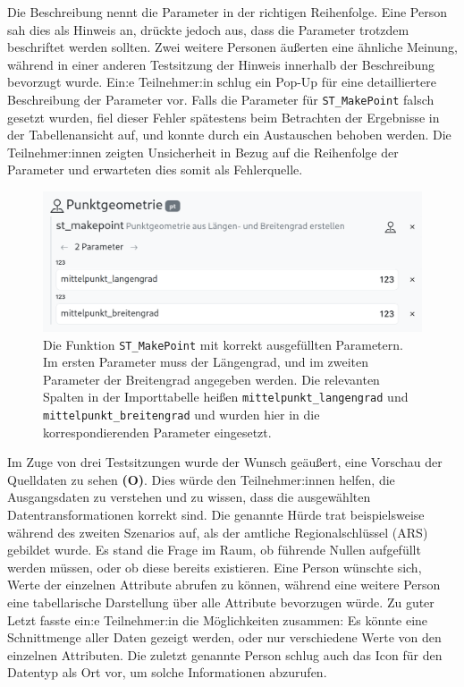 Die Beschreibung nennt die Parameter in der richtigen Reihenfolge. Eine Person sah dies als Hinweis an, drückte jedoch aus, dass die Parameter trotzdem beschriftet werden sollten. Zwei weitere Personen äußerten eine ähnliche Meinung, während in einer anderen Testsitzung der Hinweis innerhalb der Beschreibung bevorzugt wurde. Ein:e Teilnehmer:in schlug ein Pop-Up für eine detailliertere Beschreibung der Parameter vor. Falls die Parameter für \texttt{ST\_MakePoint} falsch gesetzt wurden, fiel dieser Fehler spätestens beim Betrachten der Ergebnisse in der Tabellenansicht auf, und konnte durch ein Austauschen behoben werden. Die Teilnehmer:innen zeigten Unsicherheit in Bezug auf die Reihenfolge der Parameter und erwarteten dies somit als Fehlerquelle.

\begin{figure}[!ht]
  \centering
  \includegraphics[width=.95\textwidth]{assets/st-makepoint.png}
  \caption[Die Funktion \texttt{ST\_MakePoint} im Block-Editor]{Die Funktion \texttt{ST\_MakePoint} mit korrekt ausgefüllten Parametern. Im ersten Parameter muss der Längengrad, und im zweiten Parameter der Breitengrad angegeben werden. Die relevanten Spalten in der Importtabelle heißen \texttt{mittelpunkt\_langengrad} und \texttt{mittelpunkt\_breitengrad} und wurden hier in die korrespondierenden Parameter eingesetzt.}
  \label{fig:parameters}
\end{figure}

\pskip
Im Zuge von drei Testsitzungen wurde der Wunsch geäußert, eine Vorschau der Quelldaten zu sehen \textbf{(O)}. Dies würde den Teilnehmer:innen helfen, die Ausgangsdaten zu verstehen und zu wissen, dass die ausgewählten Datentransformationen korrekt sind. Die genannte Hürde trat beispielsweise während des zweiten Szenarios auf, als der amtliche Regionalschlüssel (\acs{ARS}) gebildet wurde. Es stand die Frage im Raum, ob führende Nullen aufgefüllt werden müssen, oder ob diese bereits existieren. Eine Person wünschte sich, Werte der einzelnen Attribute abrufen zu können, während eine weitere Person eine tabellarische Darstellung über alle Attribute bevorzugen würde. Zu guter Letzt fasste ein:e Teilnehmer:in die Möglichkeiten zusammen: Es könnte eine Schnittmenge aller Daten gezeigt werden, oder nur verschiedene Werte von den einzelnen Attributen. Die zuletzt genannte Person schlug auch das Icon für den Datentyp als Ort vor, um solche Informationen abzurufen.

